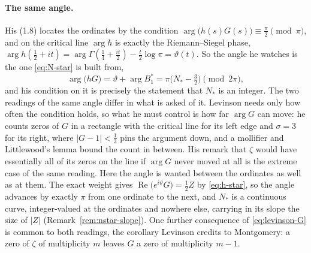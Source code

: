 \documentclass[11pt]{article}
\theoremstyle{definition}
\begin{document}
\paragraph{The same angle.} His (1.8) locates the ordinates by the condition
$\arg\bigl(h(s)G(s)\bigr)\equiv\tfrac{\pi}{2}\pmod\pi$, and on the critical line
$\arg h$ is exactly the Riemann--Siegel phase,
$\arg h(\tfrac12+it)=\arg\Gamma(\tfrac14+\tfrac{it}{2})-\tfrac{t}{2}\log\pi
=\vartheta(t)$. So the angle he watches is the one \eqref{eq:N-star} is built
from,
\[
\arg\bigl(hG\bigr)=\vartheta+\arg B_1^{\ast}
=\pi\bigl(N_{\ast}-\tfrac32\bigr)\pmod{2\pi},
\]
and his condition on it is precisely the statement that $N_{\ast}$ is an
integer. The two readings of the same angle differ in what is asked of it.
Levinson needs only how often the condition holds, so what he must control is
how far $\arg G$ can move: he counts zeros of $G$ in a rectangle with the
critical line for its left edge and $\sigma=3$ for its right, where
$|G-1|<\tfrac13$ pins the argument down, and a mollifier and Littlewood's
lemma bound the count in between. His remark that $\zeta$ would have
essentially all of its zeros on the line if $\arg G$ never moved at all is the
extreme case of the same reading. Here the angle is wanted between the
ordinates as well as at them. The exact weight gives
$\operatorname{Re}\bigl(e^{i\vartheta}G\bigr)=\tfrac12Z$ by \eqref{eq:h-star},
so the angle advances by exactly $\pi$ from one ordinate to the next, and
$N_{\ast}$ is a continuous curve, integer-valued at the ordinates and nowhere
else, carrying in its slope the size of $|Z|$
(Remark~\ref{rem:nstar-slope}). One further consequence of
\eqref{eq:levinson-G} is common to both readings, the corollary Levinson
credits to Montgomery: a zero of $\zeta$ of multiplicity $m$ leaves $G$ a zero
of multiplicity $m-1$.
\end{document}
